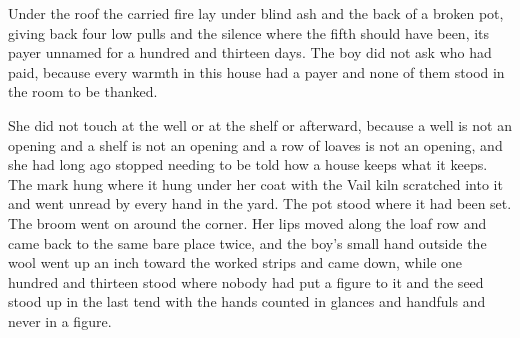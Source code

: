 Under the roof the carried fire lay under blind ash and the back of a broken pot, giving back four low pulls and the silence where the fifth should have been, its payer unnamed for a hundred and thirteen days. The boy did not ask who had paid, because every warmth in this house had a payer and none of them stood in the room to be thanked.

She did not touch  at the well or at the shelf or afterward, because a well is not an opening and a shelf is not an opening and a row of loaves is not an opening, and she had long ago stopped needing to be told how a house keeps what it keeps. The mark hung where it hung under her coat with the Vail kiln scratched into it and went unread by every hand in the yard. The pot stood where it had been set. The broom went on around the corner. Her lips moved along the loaf row and came back to the same bare place twice, and the boy's small hand outside the wool went up an inch toward the worked strips and came down, while one hundred and thirteen stood where nobody had put a figure to it and the seed stood up in the last tend with the hands counted in glances and handfuls and never in a figure.
